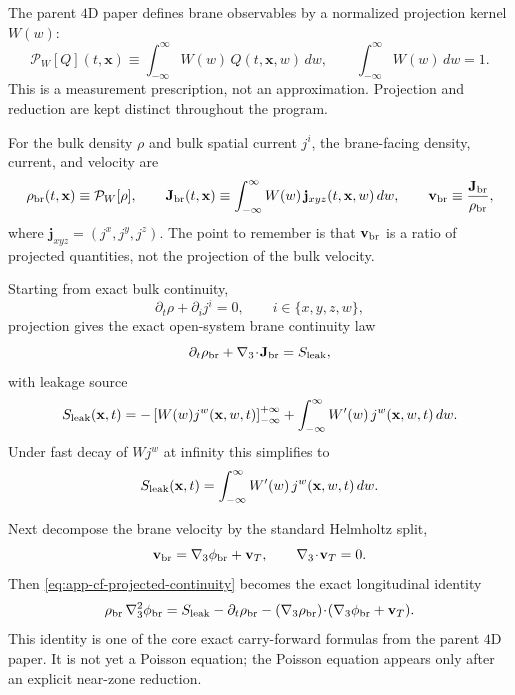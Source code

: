 \documentclass[11pt]{article}
\begin{document}
The parent \(4\)D paper defines brane observables by a normalized projection kernel
\(W(w)\):
\begin{equation}
\mathcal P_W[Q](t,\mathbf x)
\equiv
\int_{-\infty}^{\infty} W(w)\,Q(t,\mathbf x,w)\,dw,
\qquad
\int_{-\infty}^{\infty}W(w)\,dw=1.
\label{eq:app-cf-projection}
\end{equation}
This is a measurement prescription, not an approximation.  Projection and reduction are
kept distinct throughout the program.

For the bulk density \(\rho\) and bulk spatial current \(j^i\), the brane-facing density,
current, and velocity are
\begin{equation}
\rho_{\rm br}(t,\mathbf x)\equiv \mathcal P_W[\rho],
\qquad
\mathbf J_{\rm br}(t,\mathbf x)
\equiv
\int_{-\infty}^{\infty}W(w)\,\mathbf j_{xyz}(t,\mathbf x,w)\,dw,
\qquad
\mathbf v_{\rm br}\equiv \frac{\mathbf J_{\rm br}}{\rho_{\rm br}},
\label{eq:app-cf-brane-rho-J-v}
\end{equation}
where \(\mathbf j_{xyz}=(j^x,j^y,j^z)\).  The point to remember is that
\(\mathbf v_{\rm br}\) is a ratio of projected quantities, not the projection of the bulk
velocity.

Starting from exact bulk continuity,
\begin{equation}
\partial_t\rho+\partial_i j^i=0,
\qquad i\in\{x,y,z,w\},
\label{eq:app-cf-bulk-continuity}
\end{equation}
projection gives the exact open-system brane continuity law
\begin{equation}
\partial_t\rho_{\rm br}+\nabla_3\!\cdot\!\mathbf J_{\rm br}=S_{\rm leak},
\label{eq:app-cf-projected-continuity}
\end{equation}
with leakage source
\begin{equation}
S_{\rm leak}(\mathbf x,t)
=
-\left[W(w)j^w(\mathbf x,w,t)\right]_{-\infty}^{+\infty}
+\int_{-\infty}^{\infty}W'(w)\,j^w(\mathbf x,w,t)\,dw.
\label{eq:app-cf-leakage}
\end{equation}
Under fast decay of \(Wj^w\) at infinity this simplifies to
\begin{equation}
S_{\rm leak}(\mathbf x,t)
=
\int_{-\infty}^{\infty}W'(w)\,j^w(\mathbf x,w,t)\,dw.
\label{eq:app-cf-leakage-simplified}
\end{equation}

Next decompose the brane velocity by the standard Helmholtz split,
\begin{equation}
\mathbf v_{\rm br}=\nabla_3\phi_{\rm br}+\mathbf v_T,
\qquad
\nabla_3\!\cdot\!\mathbf v_T=0.
\label{eq:app-cf-helmholtz}
\end{equation}
Then \cref{eq:app-cf-projected-continuity} becomes the exact longitudinal identity
\begin{equation}
\rho_{\rm br}\,\nabla_3^2\phi_{\rm br}
=
S_{\rm leak}
-\partial_t\rho_{\rm br}
-(\nabla_3\rho_{\rm br})\!\cdot\!(\nabla_3\phi_{\rm br}+\mathbf v_T).
\label{eq:app-cf-longitudinal-identity}
\end{equation}
This identity is one of the core exact carry-forward formulas from the parent \(4\)D
paper.  It is not yet a Poisson equation; the Poisson equation appears only after an
explicit near-zone reduction.
\end{document}
